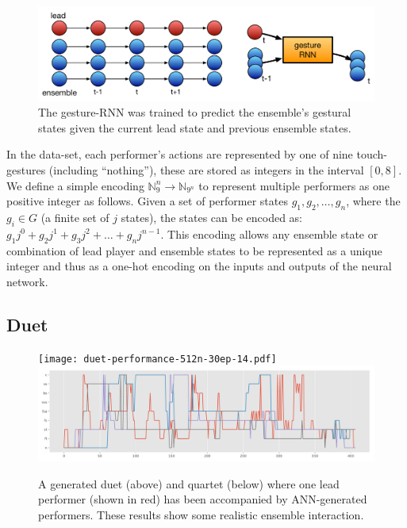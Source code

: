 \documentclass[sigchi]{acmart} %
\begin{document}
\begin{figure}
  \includegraphics[width=\columnwidth]{nn-ensemble-training}
  \caption{The gesture-RNN was trained to predict the ensemble's
    gestural states given the current lead state and previous ensemble
    states.}\label{fig:nn-ensemble-training}
\end{figure}

In the data-set, each performer's actions are represented by one of
nine touch-gestures (including ``nothing''), these are stored as
integers in the interval $[0,8]$. We define a simple encoding
$\mathbb{N}_{9}^n \rightarrow \mathbb{N}_{9^n}$ to represent multiple
performers as one positive integer as follows. Given a set of
performer states $g_1, g_2, \ldots, g_n$, where the $g_i \in G$ (a
finite set of $j$ states), the states can be encoded as:
$ g_1j^0 + g_2j^1 + g_3j^2 + \ldots + g_nj^{n-1} $.
This encoding allows any ensemble state or combination of lead player
and ensemble states to be represented as a unique integer and thus as
a one-hot encoding on the inputs and outputs of the neural network.

\subsection{Duet}

\begin{figure}
  \centering
  \texttt{[image: duet-performance-512n-30ep-14.pdf]}
  \includegraphics[width=\columnwidth]{gesture-rnn-4to3-512n3l-perf-102.pdf}
  \caption{A generated duet (above) and quartet (below) where one lead
    performer (shown in red) has been accompanied by ANN-generated
    performers. These results
    show some realistic ensemble interaction.}\label{fig:model-examples}
\end{figure}
\end{document}

